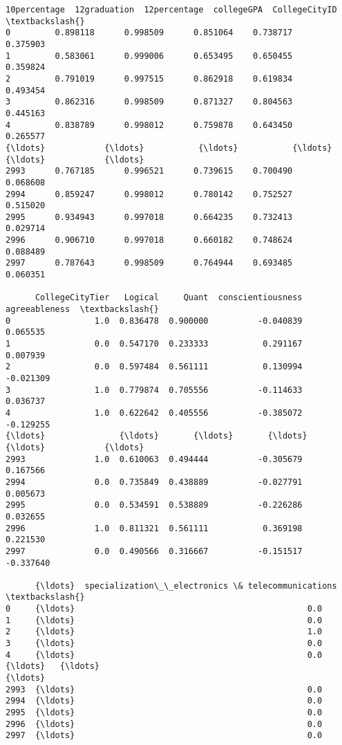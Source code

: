 \documentclass[11pt]{article}
\begin{document}
    
    \begin{Verbatim}[commandchars=\\\{\}]
      10percentage  12graduation  12percentage  collegeGPA  CollegeCityID  \textbackslash{}
0         0.898118      0.998509      0.851064    0.738717       0.375903   
1         0.583061      0.999006      0.653495    0.650455       0.359824   
2         0.791019      0.997515      0.862918    0.619834       0.493454   
3         0.862316      0.998509      0.871327    0.804563       0.445163   
4         0.838789      0.998012      0.759878    0.643450       0.265577   
{\ldots}            {\ldots}           {\ldots}           {\ldots}         {\ldots}            {\ldots}   
2993      0.767185      0.996521      0.739615    0.700490       0.068608   
2994      0.859247      0.998012      0.780142    0.752527       0.515020   
2995      0.934943      0.997018      0.664235    0.732413       0.029714   
2996      0.906710      0.997018      0.660182    0.748624       0.088489   
2997      0.787643      0.998509      0.764944    0.693485       0.060351   

      CollegeCityTier   Logical     Quant  conscientiousness  agreeableness  \textbackslash{}
0                 1.0  0.836478  0.900000          -0.040839       0.065535   
1                 0.0  0.547170  0.233333           0.291167       0.007939   
2                 0.0  0.597484  0.561111           0.130994      -0.021309   
3                 1.0  0.779874  0.705556          -0.114633       0.036737   
4                 1.0  0.622642  0.405556          -0.385072      -0.129255   
{\ldots}               {\ldots}       {\ldots}       {\ldots}                {\ldots}            {\ldots}   
2993              1.0  0.610063  0.494444          -0.305679       0.167566   
2994              0.0  0.735849  0.438889          -0.027791       0.005673   
2995              0.0  0.534591  0.538889          -0.226286       0.032655   
2996              1.0  0.811321  0.561111           0.369198       0.221530   
2997              0.0  0.490566  0.316667          -0.151517      -0.337640   

      {\ldots}  specialization\_\_electronics \& telecommunications  \textbackslash{}
0     {\ldots}                                               0.0   
1     {\ldots}                                               0.0   
2     {\ldots}                                               1.0   
3     {\ldots}                                               0.0   
4     {\ldots}                                               0.0   
{\ldots}   {\ldots}                                               {\ldots}   
2993  {\ldots}                                               0.0   
2994  {\ldots}                                               0.0   
2995  {\ldots}                                               0.0   
2996  {\ldots}                                               0.0   
2997  {\ldots}                                               0.0   


\end{Verbatim}
\end{document}
